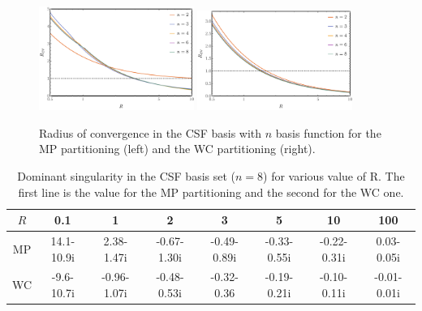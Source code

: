 \documentclass[11pt,a4paper]{article}
\begin{document}
\begin{figure}[h!]
    \centering
    \includegraphics[width=0.45\textwidth]{MPlargebasis.pdf}
    \includegraphics[width=0.45\textwidth]{WCElargebasis.pdf}
    \caption{\centering Radius of convergence in the CSF basis with $n$ basis function for the MP partitioning (left) and the WC partitioning (right).}
    \label{fig:RadiusBasis}
\end{figure}

\begin{table}[h!]
\centering
\caption{\centering Dominant singularity in the CSF basis set ($n=8$) for various value of R. The first line is the value for the MP partitioning and the second for the WC one.}
\begin{tabular}{cccccccc}
\hline
\hline
$R$ & 0.1 & 1 & 2 & 3 & 5 & 10 & 100 \\
\hline
MP & 14.1-10.9i & 2.38-1.47i & -0.67-1.30i & -0.49-0.89i & -0.33-0.55i & -0.22-0.31i & 0.03-0.05i \\
WC & -9.6-10.7i & -0.96-1.07i & -0.48-0.53i & -0.32-0.36 & -0.19-0.21i & -0.10-0.11i & -0.01-0.01i \\
\hline
\hline
\end{tabular}
\label{tab:SingAlpha}
\end{table}
\end{document}
